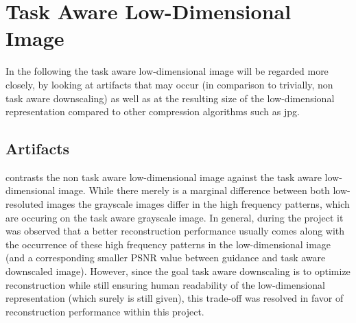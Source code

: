 \section{Task Aware Low-Dimensional Image}
In the following the task aware low-dimensional image will be regarded more closely, by looking at artifacts that may occur (in comparison to trivially, non task aware downscaling) as well as at the resulting size of the low-dimensional representation compared to other compression algorithms such as jpg. 

\subsection*{Artifacts}
 contrasts the non task aware low-dimensional image against the task aware low-dimensional image. While there merely is a marginal difference between both low-resoluted images the grayscale images differ in the high frequency patterns, which are occuring on the task aware grayscale image. In general, during the project it was observed that a better reconstruction performance usually comes along with the occurrence of these high frequency patterns in the low-dimensional image (and a corresponding smaller PSNR value between guidance and task aware downscaled image). However, since the goal task aware downscaling is to optimize reconstruction while still ensuring human readability of the low-dimensional representation (which surely is still given), this trade-off was resolved in favor of reconstruction performance within this project. 


